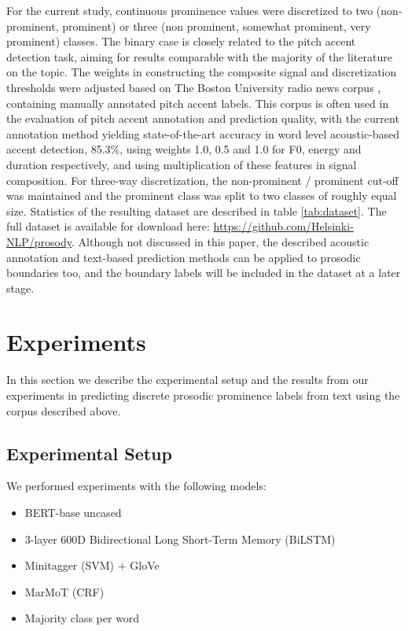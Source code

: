 \documentclass[11pt]{article}
\begin{document}
For the current study, continuous prominence values were discretized to two (non-prominent, prominent) or three (non prominent, somewhat prominent, very prominent) classes. The binary case is closely related to the pitch accent detection task, aiming
for results comparable with the majority of the literature on the topic. The weights in constructing the composite signal and discretization thresholds were adjusted based on The Boston University radio news corpus \cite{ostendorf1995boston}, containing manually annotated pitch accent labels. This corpus is often used in the evaluation of pitch accent annotation and prediction quality, with the current annotation method yielding state-of-the-art accuracy in word level acoustic-based accent detection, 85.3\%, using weights 1.0, 0.5 and 1.0 for F0, energy and duration respectively, and using multiplication of these features in signal composition. For three-way discretization, the non-prominent / prominent cut-off was maintained and the prominent class was split to two classes of roughly equal size. Statistics of the resulting dataset are described in table \ref{tab:dataset}. The full dataset is available for download here: \url{https://github.com/Helsinki-NLP/prosody}. Although not discussed in this paper, the described acoustic annotation and text-based prediction methods can be applied to prosodic boundaries too, and the boundary labels will be included in the dataset at a later stage. 


\section{Experiments} \label{sec:experiments}
In this section we describe the experimental setup and the results from our experiments in predicting discrete prosodic prominence labels from text using the corpus described above.

\subsection{Experimental Setup}

We performed experiments with the following models:
\begin{itemize}
    \item BERT-base uncased \cite{devlin2019bert}
    \item 3-layer 600D Bidirectional Long Short-Term Memory (BiLSTM) \cite{Hochreiter:1997}
    \item Minitagger (SVM) \cite{stratos-collins-2015-simple} + GloVe \cite{pennington2014glove}
    \item MarMoT (CRF) \cite{mueller-etal-2013-efficient}
    \item Majority class per word
\end{itemize}
\end{document}

